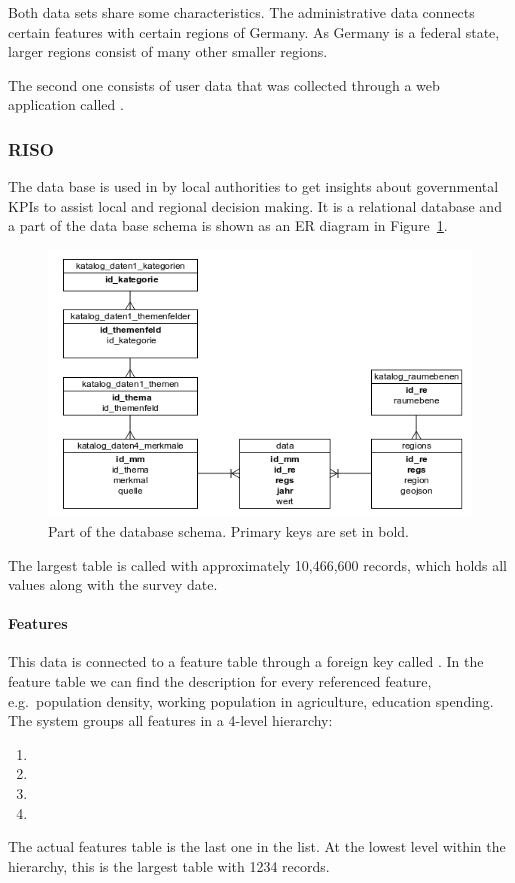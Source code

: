 Both data sets share some characteristics.
The administrative data connects certain features with certain regions of Germany.
As Germany is a federal state, larger regions consist of many other smaller regions.

The second one consists of user data that was collected through a web application called \rufu{}.

\subsubsection{RISO}

The \riso{} data base is used in by local authorities to get insights about governmental KPIs to assist local and regional decision making.
It is a relational database and a part of the data base schema is shown as an ER diagram in Figure~\ref{fig:data:riso}.

\begin{figure}[h!]
  \centering
  \includegraphics[width=\textwidth]{images/riso}
  \caption{Part of the \riso{} database schema. Primary keys are set in bold.}\label{fig:data:riso}
\end{figure}

The largest table is called  with approximately 10,466,600 records, which holds all values along with the survey date.
\paragraph{Features}
This data is connected to a feature table through a foreign key called .
In the feature table we can find the description for every referenced feature, e.g.\ population density, working population in agriculture, education spending.
The \riso{} system groups all features in a 4-level hierarchy:
\begin{enumerate}
  \item
  \item
  \item
  \item
\end{enumerate}
The actual features table is the last one in the list.
At the lowest level within the hierarchy, this is the largest table with 1234 records.



